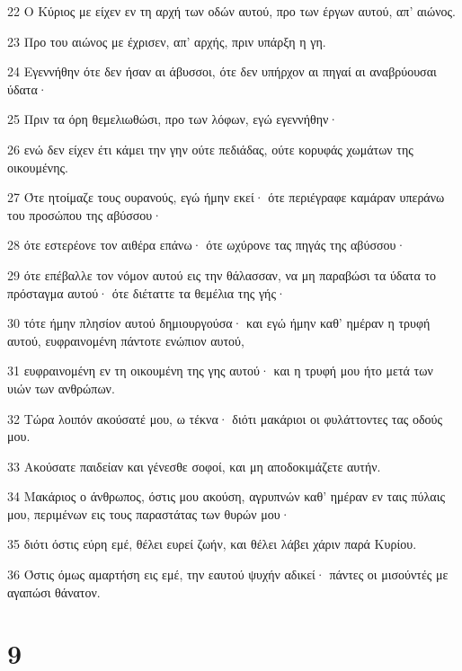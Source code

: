 \par 22 Ο Κύριος με είχεν εν τη αρχή των οδών αυτού, προ των έργων αυτού, απ' αιώνος.
\par 23 Προ του αιώνος με έχρισεν, απ' αρχής, πριν υπάρξη η γη.
\par 24 Εγεννήθην ότε δεν ήσαν αι άβυσσοι, ότε δεν υπήρχον αι πηγαί αι αναβρύουσαι ύδατα·
\par 25 Πριν τα όρη θεμελιωθώσι, προ των λόφων, εγώ εγεννήθην·
\par 26 ενώ δεν είχεν έτι κάμει την γην ούτε πεδιάδας, ούτε κορυφάς χωμάτων της οικουμένης.
\par 27 Ότε ητοίμαζε τους ουρανούς, εγώ ήμην εκεί· ότε περιέγραφε καμάραν υπεράνω του προσώπου της αβύσσου·
\par 28 ότε εστερέονε τον αιθέρα επάνω· ότε ωχύρονε τας πηγάς της αβύσσου·
\par 29 ότε επέβαλλε τον νόμον αυτού εις την θάλασσαν, να μη παραβώσι τα ύδατα το πρόσταγμα αυτού· ότε διέταττε τα θεμέλια της γής·
\par 30 τότε ήμην πλησίον αυτού δημιουργούσα· και εγώ ήμην καθ' ημέραν η τρυφή αυτού, ευφραινομένη πάντοτε ενώπιον αυτού,
\par 31 ευφραινομένη εν τη οικουμένη της γης αυτού· και η τρυφή μου ήτο μετά των υιών των ανθρώπων.
\par 32 Τώρα λοιπόν ακούσατέ μου, ω τέκνα· διότι μακάριοι οι φυλάττοντες τας οδούς μου.
\par 33 Ακούσατε παιδείαν και γένεσθε σοφοί, και μη αποδοκιμάζετε αυτήν.
\par 34 Μακάριος ο άνθρωπος, όστις μου ακούση, αγρυπνών καθ' ημέραν εν ταις πύλαις μου, περιμένων εις τους παραστάτας των θυρών μου·
\par 35 διότι όστις εύρη εμέ, θέλει ευρεί ζωήν, και θέλει λάβει χάριν παρά Κυρίου.
\par 36 Όστις όμως αμαρτήση εις εμέ, την εαυτού ψυχήν αδικεί· πάντες οι μισούντές με αγαπώσι θάνατον.

\chapter{9}

